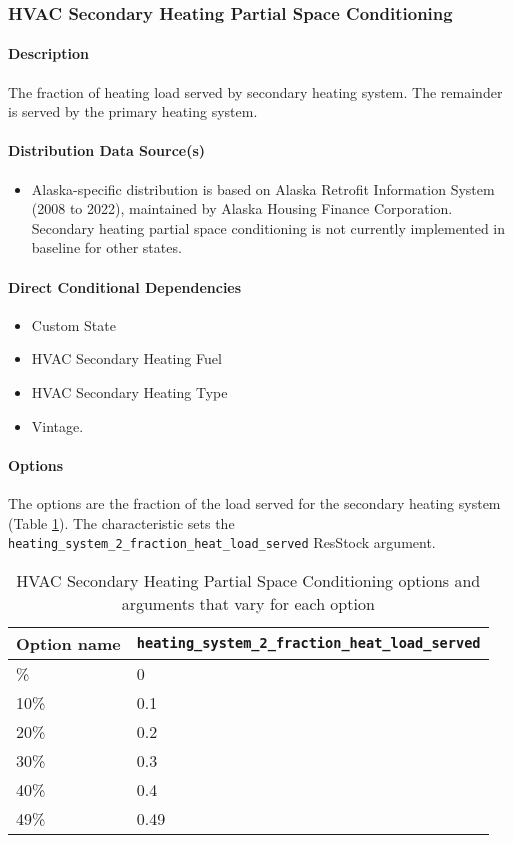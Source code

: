 \subsubsection{HVAC Secondary Heating Partial Space Conditioning}
\paragraph{Description}
The fraction of heating load served by secondary heating system. The remainder is served by the primary heating system.

\paragraph{Distribution Data Source(s)}
\begin{itemize}
\item Alaska-specific distribution is based on Alaska Retrofit Information System (2008 to 2022), maintained by Alaska Housing Finance Corporation. Secondary heating partial space conditioning is not currently implemented in baseline for other states.
\end{itemize}

\paragraph{Direct Conditional Dependencies}
\begin{itemize}
    \item Custom State
    \item HVAC Secondary Heating Fuel
    \item HVAC Secondary Heating Type
    \item Vintage.
\end{itemize}

\paragraph{Options}
The options are the fraction of the load served for the secondary heating system (Table \ref{table:hc_opt_hvac_sec_par}). The characteristic sets the \texttt{heating\_system\_2\_fraction\_heat\_load\_served} ResStock argument.

\begin{longtable}[]{|p{1.5cm}|p{5cm}|} \caption{HVAC Secondary Heating Partial Space Conditioning options and arguments that vary for each option} \label{table:hc_opt_hvac_sec_par} \\
\toprule\noalign{}
Option name &
\texttt{heating\_system\_2\_fraction\_heat\_load\_served} \\
\midrule\noalign{}
\endhead
\bottomrule\noalign{}
\endlastfoot
0\% & 0 \\
10\% & 0.1 \\
20\% & 0.2 \\
30\% & 0.3 \\
40\% & 0.4 \\
49\% & 0.49 \\
\end{longtable}

